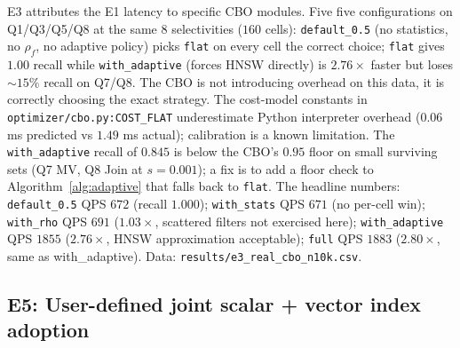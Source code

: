 \documentclass[sigconf]{acmart}
\theoremstyle{plain}
\theoremstyle{definition}
\theoremstyle{remark}
\begin{document}
E3 attributes the E1 latency to specific CBO modules. Five
five configurations on Q1/Q3/Q5/Q8 at the same 8 selectivities
($160$ cells): \texttt{default\_0.5} (no statistics, no
$\rho_f$, no adaptive policy) picks \texttt{flat} on every cell
the correct choice; \texttt{flat} gives $1.00$ recall while
\texttt{with\_adaptive} (forces HNSW directly) is $2.76\times$
faster but loses $\sim 15\%$ recall on Q7/Q8. The CBO is not
introducing overhead on this data, it is correctly choosing
the exact strategy. The cost-model constants in
\texttt{optimizer/cbo.py:COST\_FLAT} underestimate Python
interpreter overhead ($0.06$ ms predicted vs $1.49$ ms actual);
calibration is a known limitation. The \texttt{with\_adaptive}
recall of $0.845$ is below the CBO's $0.95$ floor on small
surviving sets (Q7 MV, Q8 Join at $s = 0.001$); a fix is to add a
floor check to Algorithm~\ref{alg:adaptive} that falls back to
\texttt{flat}. The headline numbers: \texttt{default\_0.5}
QPS $672$ (recall $1.000$); \texttt{with\_stats} QPS $671$ (no
per-cell win); \texttt{with\_rho} QPS $691$ ($1.03\times$, scattered
filters not exercised here); \texttt{with\_adaptive} QPS $1855$
($2.76\times$, HNSW approximation acceptable); \texttt{full} QPS
$1883$ ($2.80\times$, same as with\_adaptive). Data:
\texttt{results/e3\_real\_cbo\_n10k.csv}.

\subsection{E5: User-defined joint scalar + vector index adoption}\label{sec:eval:e5}
\end{document}
